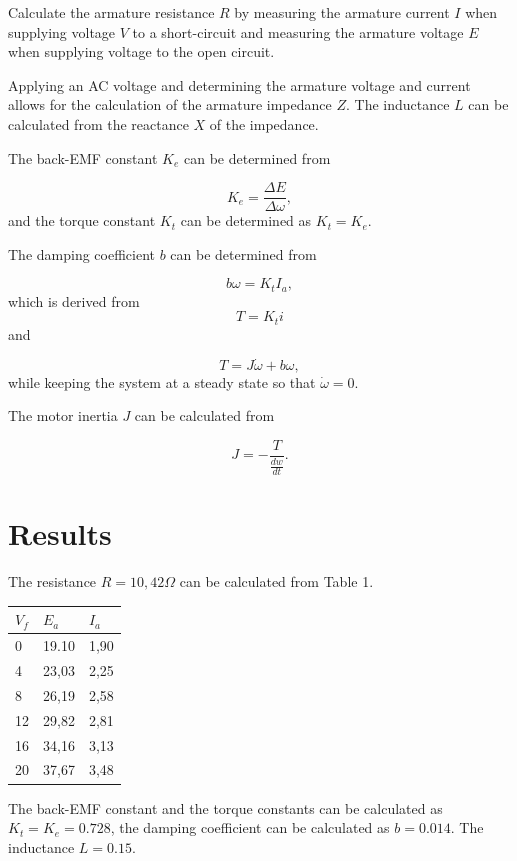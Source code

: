 \documentclass[a4paper,12pt]{article}
\numberwithin{equation}{section}
\numberwithin{figure}{section}
\numberwithin{table}{section}
\begin{document}
Calculate the armature resistance $R$ by measuring the armature
current $I$ when supplying voltage $V$ to a short-circuit and
measuring the armature voltage $E$ when supplying voltage to the open
circuit.

Applying an AC voltage and determining the armature voltage and current
allows for the calculation of the armature impedance $Z$. The
inductance $L$ can be calculated from the reactance $X$ of the
impedance.

The back-EMF constant $K_e$ can be determined from

 \begin{equation} 
K_e = \frac{\Delta E}{\Delta\omega}, 
 \end{equation} 
 and the torque constant
$K_t$ can be determined as $K_t = K_e$.

The damping coefficient $b$ can be determined from

 \begin{equation} 
b\omega = K_tI_a, 
 \end{equation} 
 which is derived from 
 \begin{equation} 
T=K_ti
 \end{equation} 
 and

 \begin{equation} 
T = J\dot\omega +b\omega, 
 \end{equation} 
 while keeping the system at a steady
state so that $\dot\omega = 0$.

The motor inertia $J$ can be calculated from

 \begin{equation} 
J = -\frac{T}{\frac{dw}{dt}}.
 \end{equation} 


\section{Results}\label{results}

The resistance $R = 10,42\Omega$ can be calculated from Table 1.

\begin{longtable}[]{@{}lll@{}}
\toprule
$V_f$ & $E_a$ & $I_a$\tabularnewline
\midrule
\endhead
0 & 19.10 & 1,90\tabularnewline
4 & 23,03 & 2,25\tabularnewline
8 & 26,19 & 2,58\tabularnewline
12 & 29,82 & 2,81\tabularnewline
16 & 34,16 & 3,13\tabularnewline
20 & 37,67 & 3,48\tabularnewline
\bottomrule
\end{longtable}

The back-EMF constant and the torque constants can be calculated as
$K_t = K_e = 0.728$, the damping coefficient can be calculated as
$b = 0.014$. The inductance $L = 0.15$.
\end{document}
